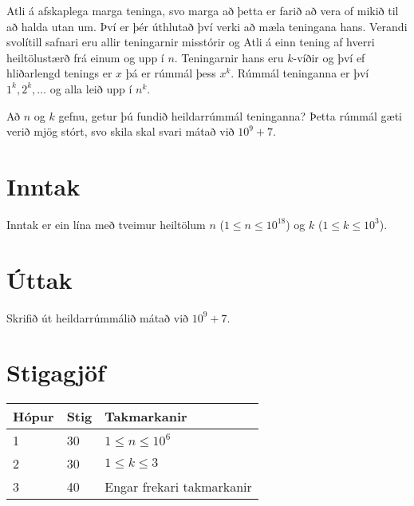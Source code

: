 
Atli á afskaplega marga teninga, svo marga að þetta er farið að vera of mikið til að halda utan um. Því er þér
úthlutað því verki að mæla teningana hans. Verandi svolítill safnari eru allir teningarnir misstórir og Atli á
einn tening af hverri heiltölustærð frá einum og upp í $n$. Teningarnir hans eru $k$-víðir og því ef hliðarlengd
tenings er $x$ þá er rúmmál þess $x^k$. Rúmmál teninganna er því $1^k, 2^k, \dots$ og alla leið upp í $n^k$.

Að $n$ og $k$ gefnu, getur þú fundið heildarrúmmál teninganna? Þetta rúmmál gæti verið mjög stórt, svo skila
skal svari mátað við $10^9 + 7$.

\section*{Inntak}
Inntak er ein lína með tveimur heiltölum $n$ ($1 \leq n \leq 10^{18}$) og $k$ ($1 \leq k \leq 10^3$).

\section*{Úttak}
Skrifið út heildarrúmmálið mátað við $10^9 + 7$.

\section*{Stigagjöf}
\begin{tabular}{|l|l|l|}
\hline
Hópur & Stig & Takmarkanir \\ \hline
1     & 30   & $1 \leq n \leq 10^6$ \\ \hline
2     & 30   & $1 \leq k \leq 3$ \\ \hline
3     & 40   & Engar frekari takmarkanir\\ \hline
\end{tabular}

